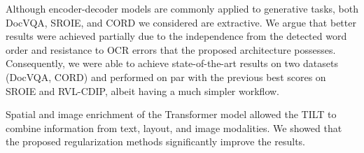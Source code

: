 \documentclass[runningheads]{llncs}
\begin{document}
Although encoder-decoder models are commonly applied to generative tasks, both DocVQA, SROIE, and CORD we considered are extractive. We argue that better results were achieved partially due to the independence from the detected word order and resistance to OCR errors that the proposed architecture possesses. 
Consequently, we were able to achieve state-of-the-art results on two datasets (DocVQA, CORD) and performed on par with the previous best scores on SROIE and RVL-CDIP, albeit having a much simpler workflow.

Spatial and image enrichment of the Transformer model allowed the TILT to combine information from text, layout, and image modalities. We showed that the proposed regularization methods significantly improve the results.













\end{document}
